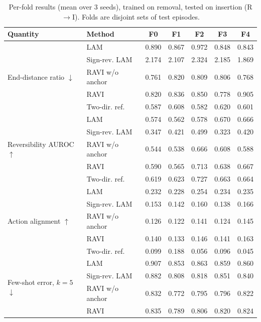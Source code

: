 \documentclass{jcse}
\newcommand{\method}{RAVI}
\begin{document}
\begin{table}
\centering
\caption{Per-fold results (mean over 3 seeds), trained on removal, tested on insertion (R$\to$I). Folds are disjoint sets of test episodes.}
\label{t:perfoldR}
\footnotesize
\setlength{\tabcolsep}{4pt}
\begin{tabular}{llccccc}
\toprule
Quantity & Method & F0 & F1 & F2 & F3 & F4 \\
\midrule
\multirow{5}{*}{End-distance ratio $\downarrow$} & LAM & 0.890 & 0.867 & 0.972 & 0.848 & 0.843 \\
 & Sign-rev. LAM & 2.174 & 2.107 & 2.324 & 2.185 & 1.869 \\
 & \method{} w/o anchor & 0.761 & 0.820 & 0.809 & 0.806 & 0.768 \\
 & \method & 0.820 & 0.836 & 0.850 & 0.778 & 0.905 \\
 & Two-dir. ref. & 0.587 & 0.608 & 0.582 & 0.620 & 0.601 \\
\midrule
\multirow{5}{*}{Reversibility AUROC $\uparrow$} & LAM & 0.574 & 0.562 & 0.578 & 0.670 & 0.666 \\
 & Sign-rev. LAM & 0.347 & 0.421 & 0.499 & 0.323 & 0.420 \\
 & \method{} w/o anchor & 0.544 & 0.538 & 0.666 & 0.608 & 0.588 \\
 & \method & 0.590 & 0.565 & 0.713 & 0.638 & 0.667 \\
 & Two-dir. ref. & 0.619 & 0.623 & 0.727 & 0.663 & 0.664 \\
\midrule
\multirow{5}{*}{Action alignment $\uparrow$} & LAM & 0.232 & 0.228 & 0.254 & 0.234 & 0.235 \\
 & Sign-rev. LAM & 0.153 & 0.142 & 0.160 & 0.138 & 0.166 \\
 & \method{} w/o anchor & 0.126 & 0.122 & 0.141 & 0.124 & 0.145 \\
 & \method & 0.140 & 0.133 & 0.146 & 0.141 & 0.163 \\
 & Two-dir. ref. & 0.099 & 0.188 & 0.056 & 0.096 & 0.045 \\
\midrule
\multirow{4}{*}{Few-shot error, $k=5$ $\downarrow$} & LAM & 0.907 & 0.853 & 0.863 & 0.859 & 0.860 \\
 & Sign-rev. LAM & 0.882 & 0.808 & 0.818 & 0.851 & 0.840 \\
 & \method{} w/o anchor & 0.832 & 0.772 & 0.795 & 0.796 & 0.822 \\
 & \method & 0.835 & 0.789 & 0.806 & 0.820 & 0.824 \\
\bottomrule
\end{tabular}
\end{table}
\end{document}
